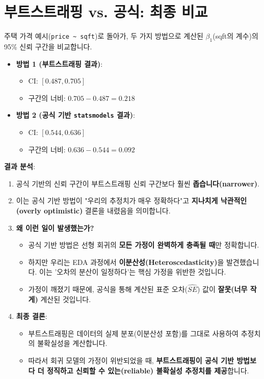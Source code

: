 \documentclass[11pt,a4paper]{book}
\theoremstyle{definition}
\begin{document}
\section{부트스트래핑 vs. 공식: 최종 비교}

주택 가격 예시(\texttt{price \textasciitilde{} sqft})로 돌아가, 두 가지 방법으로 계산된 $\beta_1$(sqft의 계수)의 95\% 신뢰 구간을 비교합니다.

\begin{tcolorbox}[colback=red!5!white, colframe=red!75!black, title={가정 위반의 결과: 부트스트래핑의 승리}]
\begin{itemize}
    \item \textbf{방법 1 (부트스트래핑 결과)}:
        \begin{itemize}
            \item CI: $[0.487, 0.705]$
            \item 구간의 너비: $0.705 - 0.487 = 0.218$
        \end{itemize}
    \item \textbf{방법 2 (공식 기반 \texttt{statsmodels} 결과)}:
        \begin{itemize}
            \item CI: $[0.544, 0.636]$
            \item 구간의 너비: $0.636 - 0.544 = 0.092$
        \end{itemize}
\end{itemize}

\textbf{결과 분석}:
\begin{enumerate}
    \item 공식 기반의 신뢰 구간이 부트스트래핑 신뢰 구간보다 훨씬 \textbf{좁습니다(narrower)}.
    \item 이는 공식 기반 방법이 "우리의 추정치가 매우 정확하다"고 \textbf{지나치게 낙관적인(overly optimistic)} 결론을 내렸음을 의미합니다.
    \item \textbf{왜 이런 일이 발생했는가?}
        \begin{itemize}
            \item 공식 기반 방법은 선형 회귀의 \textbf{모든 가정이 완벽하게 충족될 때}만 정확합니다.
            \item 하지만 우리는 EDA 과정에서 \textbf{이분산성(Heteroscedasticity)}을 발견했습니다. 이는 '오차의 분산이 일정하다'는 핵심 가정을 위반한 것입니다.
            \item 가정이 깨졌기 때문에, 공식을 통해 계산된 표준 오차($\hat{SE}$) 값이 \textbf{잘못(너무 작게)} 계산된 것입니다.
        \end{itemize}
    \item \textbf{최종 결론}:
        \begin{itemize}
            \item 부트스트래핑은 데이터의 실제 분포(이분산성 포함)를 그대로 사용하여 추정치의 불확실성을 계산합니다.
            \item 따라서 회귀 모델의 가정이 위반되었을 때, \textbf{부트스트래핑이 공식 기반 방법보다 더 정직하고 신뢰할 수 있는(reliable) 불확실성 추정치를 제공}합니다.
        \end{itemize}
\end{enumerate}
\end{tcolorbox}
\end{document}
